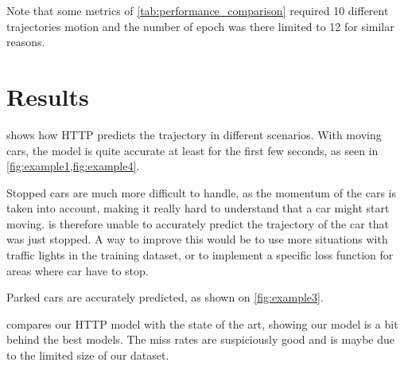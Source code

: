 \documentclass[conference]{IEEEtran}
\begin{document}
Note that some metrics of \cref{tab:performance_comparison} required 10 different trajectories motion and the number of epoch was there limited to 12 for similar reasons.

\section{Results}

 shows how HTTP predicts the trajectory in different scenarios. With moving cars, the model is quite accurate at least for the first few seconds, as seen in \cref{fig:example1,fig:example4}.

Stopped cars are much more difficult to handle, as the momentum of the cars is taken into account, making it really hard to understand that a car might start moving.  is therefore unable to accurately predict the trajectory of the car that was just stopped. A way to improve this would be to use more situations with traffic lights in the training dataset, or to implement a specific loss function for areas where car have to stop.

Parked cars are accurately predicted, as shown on \cref{fig:example3}.

 compares our HTTP model with the state of the art, showing our model is a bit behind the best models. The miss rates are suspiciously good and is maybe due to the limited size of our dataset.
\end{document}
